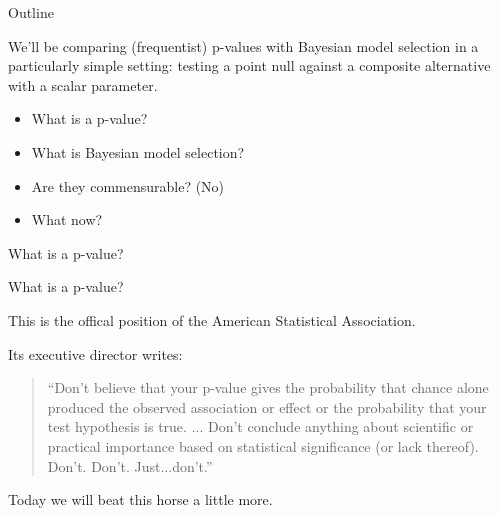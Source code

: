 
\begin{frame}{Outline}

We'll be comparing (frequentist) p-values with Bayesian model selection
in a particularly simple setting: testing a point null against a composite
alternative with a scalar parameter.

\begin{itemize}
    \item What is a p-value?
    \item What is Bayesian model selection?
    \item Are they commensurable?  (No)
    \item What now?
\end{itemize}

\end{frame}



\begin{frame}{What is a p-value?}

What is a p-value?

\vspace{1em}


\vspace{1em}

This is the offical position of the American Statistical Association.

\pause
Its executive director writes:

\vspace{1em}

\begin{quote}
``Don’t believe that your p-value gives the probability that chance alone
produced the observed association or effect or the probability that your test
hypothesis is true.  ... Don’t conclude anything about scientific or practical
importance based on statistical significance (or lack thereof).  Don’t. Don’t.
Just...don’t.''  \citep{wasserstein:2019:beyondp}
\end{quote}

\vspace{1em}

\pause Today we will beat this horse a little more.

\end{frame}


